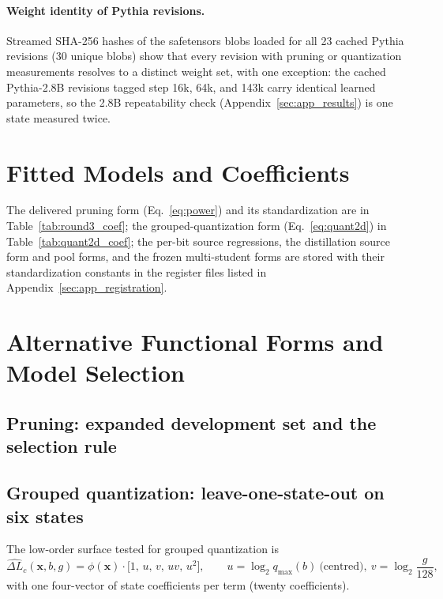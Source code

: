 \paragraph{Weight identity of Pythia revisions.} Streamed SHA-256
hashes of the safetensors blobs loaded for all 23 cached Pythia
revisions (30 unique blobs) show that every revision with pruning or
quantization measurements resolves to a distinct weight set, with one
exception: the cached Pythia-2.8B revisions tagged step 16k, 64k, and
143k carry identical learned parameters, so the 2.8B repeatability
check (Appendix~\ref{sec:app_results}) is one state measured twice.



\section{Fitted Models and Coefficients}
\label{sec:app_coef}
The delivered pruning form (Eq.~\ref{eq:power}) and its standardization are in Table~\ref{tab:round3_coef}; the
grouped-quantization form (Eq.~\ref{eq:quant2d}) in Table~\ref{tab:quant2d_coef}; the per-bit source regressions,
the distillation source form and pool forms, and the frozen multi-student forms are stored with their standardization
constants in the register files listed in Appendix~\ref{sec:app_registration}.


\FloatBarrier

\section{Alternative Functional Forms and Model Selection}
\label{sec:app_forms}
\subsection{Pruning: expanded development set and the selection rule}

\FloatBarrier
\subsection{Grouped quantization: leave-one-state-out on six states}


The low-order surface tested for grouped quantization is
\begin{equation}
\widehat{\Delta L}_c(\mathbf x,b,g)=\phi(\mathbf x)\cdot\big[1,\,u,\,v,\,uv,\,u^2\big],
\qquad u=\log_2 q_{\max}(b)\ \text{(centred)},\ v=\log_2\frac{g}{128},
\label{eq:quant2d}
\end{equation}
with one four-vector of state coefficients per term (twenty coefficients).

